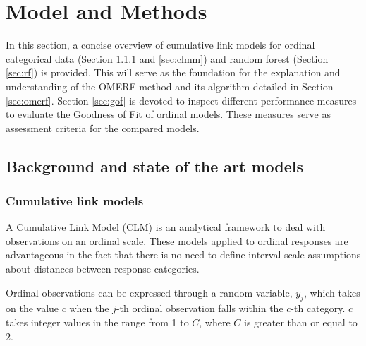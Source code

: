 \section{Model and Methods}
\label{sec:methods}
In this section, a concise overview of cumulative link models for ordinal categorical data (Section \ref{sec:clm} and \ref{sec:clmm}) and random forest (Section \ref{sec:rf}) is provided.
This will serve as the foundation for the explanation and understanding of the OMERF method and its algorithm detailed in Section \ref{sec:omerf}.  Section \ref{sec:gof} is devoted to inspect different performance measures to evaluate the Goodness of Fit of ordinal models.
These measures serve as assessment criteria for the compared models.

\subsection{Background and state of the art models}

\subsubsection{Cumulative link models}
\label{sec:clm}
A Cumulative Link Model (CLM) \cite{agresti2010analysis,ananth1997regression,mccullagh1980regression} is an analytical framework to deal with observations on an ordinal scale.
These models applied to ordinal responses are advantageous in the fact that there is no need to define interval-scale assumptions about distances between response categories.

Ordinal observations can be expressed through a random variable, \(y_{j}\), which takes on the value \(c\) when the \(j\)-th ordinal observation falls within the \(c\)-th category. \(c\) takes integer values in the range from 1 to \(C\), where \(C\) is greater than or equal to 2.

